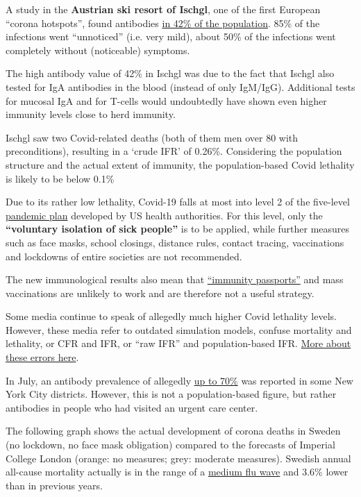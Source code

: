 A study in the \textbf{Austrian ski resort of Ischgl}, one of the first
European ``corona hotspots'', found antibodies
\href{https://www.derstandard.at/story/2000118306133/42-4-prozent-der-bewohner-ischgls-haben-antikoerper-gegen-sars}{in
42\% of the population}. 85\% of the infections went ``unnoticed'' (i.e.
very mild), about 50\% of the infections went completely without
(noticeable) symptoms.

The high antibody value of 42\% in Ischgl was due to the fact that
Ischgl also tested for IgA antibodies in the blood (instead of only
IgM/IgG). Additional tests for mucosal IgA and for T-cells would
undoubtedly have shown even higher immunity levels close to herd
immunity.

Ischgl saw two Covid-related deaths (both of them men over 80 with
preconditions), resulting in a `crude IFR' of 0.26\%. Considering the
population structure and the actual extent of immunity, the
population-based Covid lethality is likely to be below 0.1\%

Due to its rather low lethality, Covid-19 falls at most into level 2 of
the five-level
\href{https://www.cidrap.umn.edu/news-perspective/2007/02/hhs-ties-pandemic-mitigation-advice-severity}{pandemic
plan} developed by US health authorities. For this level, only the
\textbf{``voluntary isolation of sick people''} is to be applied, while
further measures such as face masks, school closings, distance rules,
contact tracing, vaccinations and lockdowns of entire societies are not
recommended.

The new immunological results also mean that
\href{https://www.nature.com/articles/d41586-020-01451-0}{``immunity
passports''} and mass vaccinations are unlikely to work and are
therefore not a useful strategy.

Some media continue to speak of allegedly much higher Covid lethality
levels. However, these media refer to outdated simulation models,
confuse mortality and lethality, or CFR and IFR, or ``raw IFR'' and
population-based IFR.
\href{https://swprs.org/covid19-lethality-how-not-to-do-it/}{More about
these errors here}.

In July, an antibody prevalence of allegedly
\href{https://www.nytimes.com/2020/07/09/nyregion/nyc-coronavirus-antibodies.html}{up
to 70\%} was reported in some New York City districts. However, this is
not a population-based figure, but rather antibodies in people who had
visited an urgent care center.

The following graph shows the actual development of corona deaths in
Sweden (no lockdown, no face mask obligation) compared to the forecasts
of Imperial College London (orange: no measures; grey: moderate
measures). Swedish annual all-cause mortality actually is in the range
of a
\href{https://swprs.files.wordpress.com/2020/06/sweden-all-cause-nov-may-1990.jpg}{medium
flu wave} and 3.6\% lower than in previous years.

